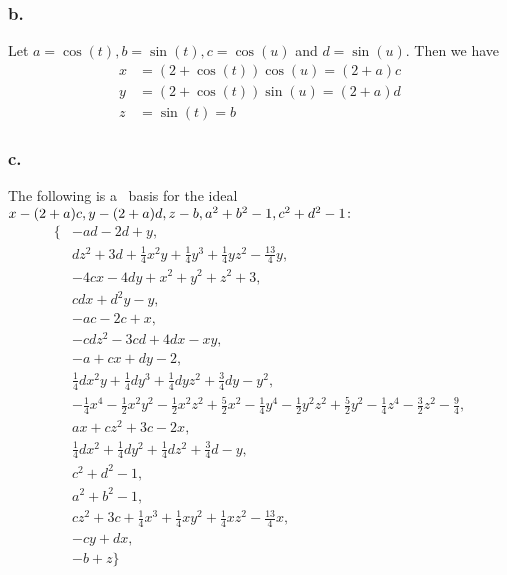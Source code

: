 \documentclass[letterpaper]{article}
\begin{document}
\subsubsection*{b.}

Let $a = \cos(t), b = \sin(t), c = \cos(u)$ and $d = \sin(u)$.
Then we have
\begin{align*}
  x &= (2 + \cos(t))\cos(u) = (2 + a)c \\
  y &= (2 + \cos(t))\sin(u) = (2 + a)d \\
  z &= \sin(t) = b
\end{align*}

\subsubsection*{c.}

The following is a \Grobner\ basis for the ideal $\gen{x - (2 + a)c, y - (2 + a)d, z - b, a^{2} + b^{2} - 1, c^{2} + d^{2} - 1}\colon$
\begin{align*}
  \{&-a d - 2 d + y, \\
  &d z^{2} + 3 d + \frac{1}{4} x^{2} y + \frac{1}{4} y^{3} + \frac{1}{4} y z^{2} - \frac{13}{4} y, \\
  &-4 c x - 4 d y + x^{2} + y^{2} + z^{2} + 3, \\
  &c d x + d^{2} y - y, \\
  &-a c - 2 c + x, \\
  &-c d z^{2} - 3 c d + 4 d x - x y, \\
  &-a + c x + d y - 2, \\
  &\frac{1}{4} d x^{2} y + \frac{1}{4} d y^{3} + \frac{1}{4} d y z^{2} + \frac{3}{4} d y - y^{2}, \\
  &-\frac{1}{4} x^{4} - \frac{1}{2} x^{2} y^{2} - \frac{1}{2} x^{2} z^{2} + \frac{5}{2} x^{2} - \frac{1}{4} y^{4} - \frac{1}{2} y^{2} z^{2} + \frac{5}{2} y^{2} - \frac{1}{4} z^{4} - \frac{3}{2} z^{2} - \frac{9}{4}, \\
  &a x + c z^{2} + 3 c - 2 x, \\
  &\frac{1}{4} d x^{2} + \frac{1}{4} d y^{2} + \frac{1}{4} d z^{2} + \frac{3}{4} d - y, \\
  &c^{2} + d^{2} - 1, \\
  &a^{2} + b^{2} - 1, \\
  &c z^{2} + 3 c + \frac{1}{4} x^{3} + \frac{1}{4} x y^{2} + \frac{1}{4} x z^{2} - \frac{13}{4} x, \\
  &-c y + d x, \\
  &-b + z\}
\end{align*}
\end{document}
